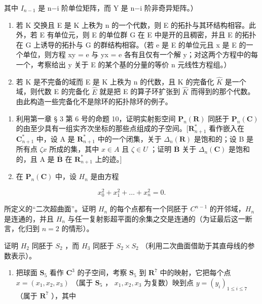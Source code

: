 其中 \(I_{n-1}\) 是 n−i 阶单位矩阵，而 Y 是 n−i 阶非奇异矩阵。）

\begin{enumerate}
\def\labelenumi{\alph{enumi})}
\setcounter{enumi}{2}
\item
  若 K 交换且 E 是 K 上秩为 n 的一个代数，则 E 的拓扑与其环结构相容。此外，若 E 有单位元，则 E 的单位群 G 在 E 中是开的且稠密，并且 E 的拓扑在 G 上诱导的拓扑与 G 的群结构相容。（若 e 是 E 的单位元且 x 是 E 的一个单位，则方程 xy = e 与 yx = e 各有且仅有一个解 y；对这两个方程中的每一个，考察给出 y 关于 E 的某个基的分量的等价 n 元线性方程组。）
\item
  若 K 是不完备的域而 E 是 K 上秩为 n 的代数，且 K 的完备化 \(\hat{K}\) 是一个域，则代数 E 的完备化 \(\hat{E}\) 就是把 E 的算子环扩张到 \(\hat{K}\) 而得到的那个代数。由此构造一些完备化不是除环的拓扑除环的例子。
\end{enumerate}

\begin{enumerate}
\def\labelenumi{\arabic{enumi})}
\setcounter{enumi}{2}
\item
  利用第一章 § 3 第 6 号的命题 10，证明实射影空间 \(\mathbf{P}_{n}(\mathbf{R})\) 同胚于 \(\mathbf{P}_{n}(\mathbf{C})\) 的由至少具有一组实齐次坐标的那些点组成的子空间。\([\mathbf{R}_{n+1}^{*}\) 看作嵌入在 \(\mathbf{C}_{n+1}^{*}\) 中，设 A 是 \(\mathbf{R}_{n+1}^{*}\) 中的一个闭集，关于 \(\Delta_{n}(\mathbf{R})\) 是饱和的；设 B 是所有点 \(\zeta x\) 所成的集，其中 \(x \in A\) 且 \(\zeta \in U\) ；证明 \(\overline{\mathbf{B}}\) 关于 \(\Delta_{n}(\mathbf{C})\) 是饱和的，且 A 是 \(\overline{\mathbf{B}}\) 在 \(\mathbf{R}_{n+1}^{*}\) 上的迹。{]}
\item
  在 \(\mathbf{P}_{n}(\mathbf{C})\) 中，设 \(H_{n}\) 是由方程
\end{enumerate}

\[
x _ {0} ^ {2} + x _ {1} ^ {2} + \dots + x _ {n} ^ {2} = 0.
\]

所定义的“二次超曲面”。证明 \(H_{n}\) 的每个点都有一个同胚于 \(C^{n-1}\) 的开邻域，\(H_{n}\) 是连通的，并且 \(H_{n}\) 与任一复射影超平面的余集之交是连通的（为证最后这一断言，化归到 \(n = 2\) 的情形）。

证明 \(H_{2}\) 同胚于 \(S_{2}\) ，而 \(H_{3}\) 同胚于 \(S_{2} \times S_{2}\) （利用二次曲面借助于其直母线的参数表示）。

\begin{enumerate}
\def\labelenumi{\arabic{enumi})}
\setcounter{enumi}{4}
\tightlist
\item
  把球面 \(\mathbf{S}_5\) 看作 \(\mathbf{C}^3\) 的子空间，考察 \(\mathbf{S}_5\) 到 \(\mathbf{R}^7\) 中的映射，它把每个点 \(x = (x_1, x_2, x_3)\) （属于 \(\mathbf{S}_5\) ， \(x_1, x_2, x_3\) 为复数）映到点 \(y = (y_i)_{1 \leqslant i \leqslant 7}\) （属于 \(\mathbf{R}^7\) ），其中
\end{enumerate}

